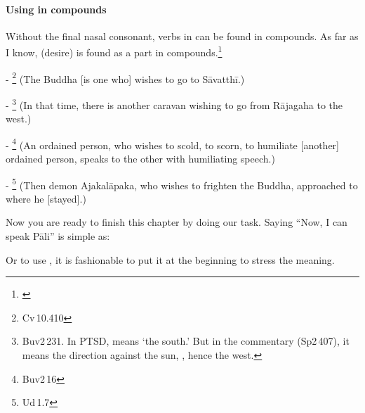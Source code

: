 \paragraph*{Using in compounds} Without the final nasal consonant, verbs in  can be found in compounds. As far as I know,  (desire) is found as a part in compounds.\footnote{\citealp[p.~374]{perniola:grammar}}\par
- \footnote{Cv\,10.410} (The Buddha [is one who] wishes to go to S\=avatth\=i.)\par
- \footnote{Buv2\,231. In PTSD,  means `the south.' But in the commentary (Sp2\,407), it means the direction against the sun, , hence the west.} (In that time, there is another caravan wishing to go from R\=ajagaha to the west.)\par
- \footnote{Buv2\,16} (An ordained person, who wishes to scold, to scorn, to humiliate [another] ordained person, speaks to the other with humiliating speech.)\par
- \footnote{Ud\,1.7} (Then demon Ajakal\=apaka, who wishes to frighten the Buddha, approached to where he [stayed].)\par

\bigskip
Now you are ready to finish this chapter by doing our task. Saying ``Now, I can speak P\=ali'' is simple as:


Or to use , it is fashionable to put it at the beginning to stress the meaning.


